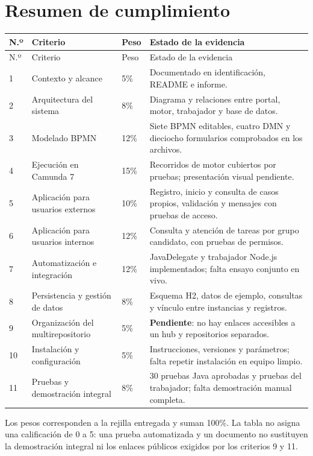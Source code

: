 \documentclass[11pt,letterpaper]{article}
\begin{document}
\section*{Resumen de cumplimiento}
\small
\begin{longtable}{@{}p{0.7cm}p{4.25cm}p{1.3cm}p{7.0cm}@{}}
\toprule
N.º & Criterio & Peso & Estado de la evidencia \\
\midrule
\endfirsthead
\toprule N.º & Criterio & Peso & Estado de la evidencia \\
\midrule\endhead
1 & Contexto y alcance & 5\% & Documentado en identificación, README e informe. \\
2 & Arquitectura del sistema & 8\% & Diagrama y relaciones entre portal, motor, trabajador y base de datos. \\
3 & Modelado BPMN & 12\% & Siete BPMN editables, cuatro DMN y dieciocho formularios comprobados en los archivos. \\
4 & Ejecución en Camunda 7 & 15\% & Recorridos de motor cubiertos por pruebas; presentación visual pendiente. \\
5 & Aplicación para usuarios externos & 10\% & Registro, inicio y consulta de casos propios, validación y mensajes con pruebas de acceso. \\
6 & Aplicación para usuarios internos & 12\% & Consulta y atención de tareas por grupo candidato, con pruebas de permisos. \\
7 & Automatización e integración & 12\% & JavaDelegate y trabajador Node.js implementados; falta ensayo conjunto en vivo. \\
8 & Persistencia y gestión de datos & 8\% & Esquema H2, datos de ejemplo, consultas y vínculo entre instancias y registros. \\
9 & Organización del multirepositorio & 5\% & \textbf{Pendiente}: no hay enlaces accesibles a un hub y repositorios separados. \\
10 & Instalación y configuración & 5\% & Instrucciones, versiones y parámetros; falta repetir instalación en equipo limpio. \\
11 & Pruebas y demostración integral & 8\% & 30 pruebas Java aprobadas y pruebas del trabajador; falta demostración manual completa. \\
\bottomrule
\end{longtable}
\normalsize
Los pesos corresponden a la rejilla entregada y suman 100\%. La tabla no asigna una calificación de 0 a 5: una prueba automatizada y un documento no sustituyen la demostración integral ni los enlaces públicos exigidos por los criterios 9 y 11.
\end{document}

